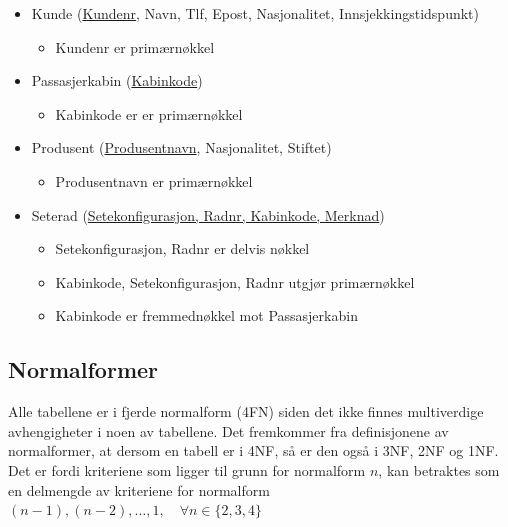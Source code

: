 \documentclass[a4paper,12pt, norsk]{article}
\begin{document}
\begin{itemize}
\item Kunde (\underline{Kundenr}, Navn, Tlf, Epost, Nasjonalitet, Innsjekkingstidspunkt)
\begin{itemize}
\item Kundenr er primærnøkkel
\end{itemize}

\item Passasjerkabin (\underline{Kabinkode})
\begin{itemize}
\item Kabinkode er er primærnøkkel
\end{itemize}

\item Produsent (\underline{Produsentnavn}, Nasjonalitet, Stiftet)
\begin{itemize}
\item Produsentnavn er primærnøkkel
\end{itemize}

\item Seterad (\underline{Setekonfigurasjon, Radnr, Kabinkode, Merknad})
\begin{itemize}
\item Setekonfigurasjon, Radnr er delvis nøkkel
\item Kabinkode, Setekonfigurasjon, Radnr utgjør primærnøkkel
\item Kabinkode er fremmednøkkel mot Passasjerkabin 
\end{itemize}

\end{itemize}

\subsection{Normalformer}
Alle tabellene er i fjerde normalform (4FN) siden det ikke finnes
multiverdige avhengigheter i noen av tabellene. Det fremkommer fra definisjonene
av normalformer, at dersom en tabell er i 4NF, så er den også i 3NF, 2NF og 1NF.
Det er fordi kriteriene som ligger til grunn for normalform $n$, kan betraktes
som en delmengde av kriteriene for normalform $(n-1), (n-2), \ldots, 1, \quad \forall
n \in \{2,3,4\}$
\end{document}
